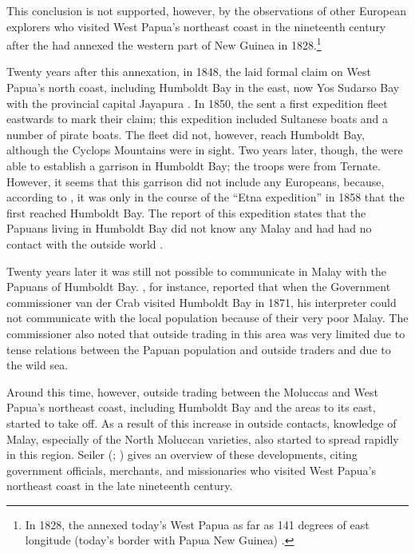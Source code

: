 {This conclusion is not supported, however, by the observations of other European explorers who visited West Papua’s northeast coast in the nineteenth century after the  had annexed the western part of New Guinea in 1828.\footnote{In 1828, the  annexed today’s West Papua as far as 141 degrees of east longitude (today’s border with Papua New Guinea) \citep[509]{Burke.1831}.}



Twenty years after this annexation, in 1848, the  laid formal claim on West Papua’s north coast, including Humboldt Bay in the east, now Yos Sudarso Bay with the provincial capital Jayapura \citep[56]{Rowley.1972}. In 1850, the  sent a first expedition fleet eastwards to mark their claim; this expedition included Sultanese boats and a number of pirate boats. The fleet did not, however, reach Humboldt Bay, although the Cyclops Mountains were in sight. Two years later, though, the  were able to establish a garrison in Humboldt Bay; the troops were from Ternate. However, it seems that this garrison did not include any Europeans, because, according to \citet[74]{Seiler.1982}, it was only in the course of the  ``Etna expedition'' in 1858 that the  first reached Humboldt Bay. The report of this expedition states that the Papuans living in Humboldt Bay did not know any Malay and had had no contact with the outside world \citep[182--183]{CommissievoorNieuwGuinea.1862}.



Twenty years later it was still not possible to communicate in Malay with the Papuans of Humboldt Bay. \citet[127--129]{RobidevanderAa.1879}, for instance, reported that when the Government commissioner van der Crab visited Humboldt Bay in 1871, his interpreter could not communicate with the local population because of their very poor Malay. The commissioner also noted that outside trading in this area was very limited due to tense relations between the Papuan population and outside traders and due to the wild sea.



Around this time, however, outside trading between the Moluccas and West Papua’s northeast coast, including Humboldt Bay and the areas to its east, started to take off. As a result of this increase in outside contacts, knowledge of Malay, especially of the North Moluccan varieties, also started to spread rapidly in this region. Seiler (\citeyear*{Seiler.1982}; \citeyear*{Seiler.1985}) gives an overview of these developments, citing government officials, merchants, and missionaries who visited West Pap\-ua’s northeast coast in the late nineteenth century.



}
